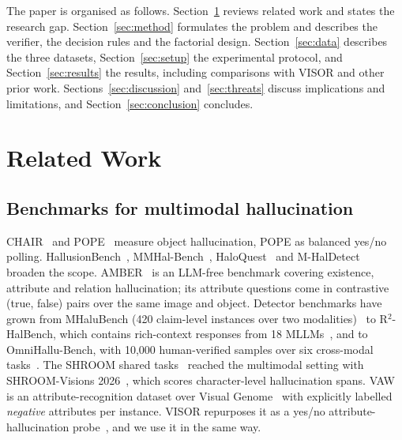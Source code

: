 \documentclass[11pt]{article}
\begin{document}
The paper is organised as follows. Section~\ref{sec:related} reviews related work and states the research gap. Section~\ref{sec:method} formulates the problem and describes the verifier, the decision rules and the factorial design. Section~\ref{sec:data} describes the three datasets, Section~\ref{sec:setup} the experimental protocol, and Section~\ref{sec:results} the results, including comparisons with VISOR and other prior work. Sections~\ref{sec:discussion} and~\ref{sec:threats} discuss implications and limitations, and Section~\ref{sec:conclusion} concludes.

\section{Related Work}\label{sec:related}

\subsection{Benchmarks for multimodal hallucination}
CHAIR~\cite{rohrbach2018chair} and POPE~\cite{li2023pope} measure object hallucination, POPE as balanced yes/no polling. HallusionBench~\cite{guan2024hallusionbench}, MMHal-Bench~\cite{sun2024llavarlhf}, HaloQuest~\cite{wang2024haloquest} and M-HalDetect~\cite{gunjal2024mhaldetect} broaden the scope. AMBER~\cite{wang2023amber} is an LLM-free benchmark covering existence, attribute and relation hallucination; its attribute questions come in contrastive (true, false) pairs over the same image and object. Detector benchmarks have grown from MHaluBench (420 claim-level instances over two modalities)~\cite{chen2024unihd} to R$^2$-HalBench, which contains rich-context responses from 18 MLLMs~\cite{guo2026vbackchecker}, and to OmniHallu-Bench, with 10{,}000 human-verified samples over six cross-modal tasks~\cite{yang2026omnihallu}. The SHROOM shared tasks~\cite{mickus2024shroom,vazquez2025mushroom} reached the multimodal setting with SHROOM-Visions 2026~\cite{vazquez2026shroomvisions}, which scores character-level hallucination spans. VAW~\cite{pham2021vaw} is an attribute-recognition dataset over Visual Genome~\cite{krishna2017visualgenome} with explicitly labelled \emph{negative} attributes per instance. VISOR repurposes it as a yes/no attribute-hallucination probe~\cite{zhang2026visor}, and we use it in the same way.
\end{document}
